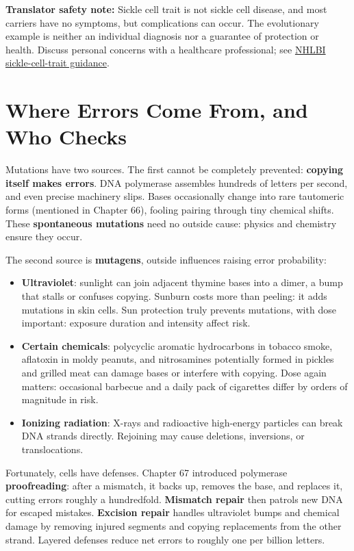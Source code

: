 \textbf{Translator safety note:} Sickle cell trait is not sickle cell disease, and most carriers have no symptoms, but complications can occur. The evolutionary example is neither an individual diagnosis nor a guarantee of protection or health. Discuss personal concerns with a healthcare professional; see \href{https://www.nhlbi.nih.gov/health/sickle-cell-disease/sickle-cell-trait}{NHLBI sickle-cell-trait guidance}.

\section{Where Errors Come From, and Who Checks}

Mutations have two sources. The first cannot be completely prevented: \textbf{copying itself makes errors}. DNA polymerase assembles hundreds of letters per second, and even precise machinery slips. Bases occasionally change into rare tautomeric forms (mentioned in Chapter 66), fooling pairing through tiny chemical shifts. These \textbf{spontaneous mutations} need no outside cause: physics and chemistry ensure they occur.

The second source is \textbf{mutagens}, outside influences raising error probability:

\begin{itemize}[itemsep=2pt]
\item \textbf{Ultraviolet}: sunlight can join adjacent thymine bases into a dimer, a bump that stalls or confuses copying. Sunburn costs more than peeling: it adds mutations in skin cells. Sun protection truly prevents mutations, with dose important: exposure duration and intensity affect risk.
\item \textbf{Certain chemicals}: polycyclic aromatic hydrocarbons in tobacco smoke, aflatoxin in moldy peanuts, and nitrosamines potentially formed in pickles and grilled meat can damage bases or interfere with copying. Dose again matters: occasional barbecue and a daily pack of cigarettes differ by orders of magnitude in risk.
\item \textbf{Ionizing radiation}: X-rays and radioactive high-energy particles can break DNA strands directly. Rejoining may cause deletions, inversions, or translocations.
\end{itemize}

Fortunately, cells have defenses. Chapter 67 introduced polymerase \textbf{proofreading}: after a mismatch, it backs up, removes the base, and replaces it, cutting errors roughly a hundredfold. \textbf{Mismatch repair} then patrols new DNA for escaped mistakes. \textbf{Excision repair} handles ultraviolet bumps and chemical damage by removing injured segments and copying replacements from the other strand. Layered defenses reduce net errors to roughly one per billion letters.

